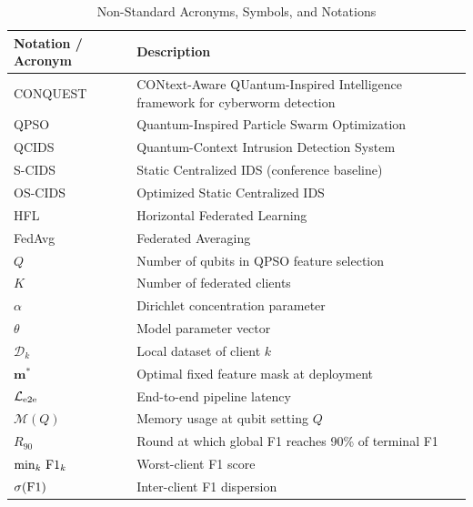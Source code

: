 \documentclass[conference]{IEEEtran}
\begin{document}
\begin{table}[!t]
\centering
\scriptsize
\caption{Non-Standard Acronyms, Symbols, and Notations}
\label{tab:acronyms_notations}
\setlength{\tabcolsep}{4pt}
\renewcommand{\arraystretch}{1.05}
\begin{tabular}{p{1.8cm} p{5.2cm}}
\hline\toprule
\textbf{Notation / Acronym} & \textbf{Description} \\
\hline\toprule
CONQUEST  & CONtext-Aware QUantum-Inspired Intelligence
            framework for cyberworm detection \\
QPSO      & Quantum-Inspired Particle Swarm Optimization \\
QCIDS     & Quantum-Context Intrusion Detection System \\
S-CIDS    & Static Centralized IDS (conference baseline) \\
OS-CIDS   & Optimized Static Centralized IDS \\
HFL       & Horizontal Federated Learning \\
FedAvg    & Federated Averaging \\
\midrule
$Q$                     & Number of qubits in QPSO
                          feature selection \\
$K$                     & Number of federated clients \\
$\alpha$                & Dirichlet concentration parameter \\
$\theta$                & Model parameter vector \\
$\mathcal{D}_k$         & Local dataset of client $k$ \\
$\mathbf{m}^{*}$        & Optimal fixed feature mask
                          at deployment \\
$\mathcal{L}_{\rm e2e}$ & End-to-end pipeline latency \\
$\mathcal{M}(Q)$        & Memory usage at qubit setting $Q$ \\
$R_{90}$                & Round at which global F1 reaches
                          90\% of terminal F1 \\
$\min_k\,{\rm F1}_k$    & Worst-client F1 score \\
$\sigma({\rm F1})$      & Inter-client F1 dispersion \\
\hline\toprule
\end{tabular}
\end{table}
\end{document}
